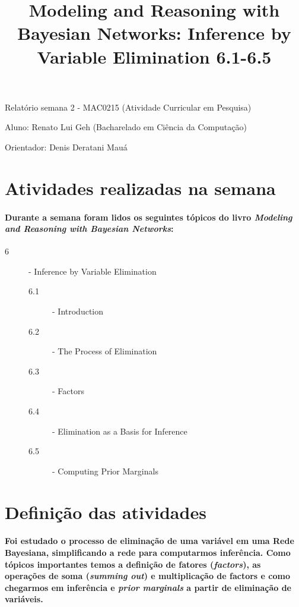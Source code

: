 \documentclass[a4paper,10pt]{article}
\title{\textbf{Modeling and Reasoning with Bayesian Networks: Inference by Variable Elimination 6.1-6.5}}
\theoremstyle{plain}
\begin{document}
\date{}
\author{}
\vspace*{-40pt}
{\let\newpage\relax\maketitle}

Relatório semana 2 - MAC0215 (Atividade Curricular em Pesquisa)

Aluno: Renato Lui Geh (Bacharelado em Ciência da Computação)

Orientador: Denis Deratani Mauá

\section{Atividades realizadas na semana}

\paragraph{
  Durante a semana foram lidos os seguintes tópicos do livro \textit{Modeling and Reasoning with
Bayesian Networks}\cite{bayes-net-darwiche}:
}

\begin{description}
  \item[6] - Inference by Variable Elimination
  \begin{description}
    \item[6.1] - Introduction
    \item[6.2] - The Process of Elimination
    \item[6.3] - Factors
    \item[6.4] - Elimination as a Basis for Inference
    \item[6.5] - Computing Prior Marginals
  \end{description}
\end{description}

\section{Definição das atividades}

\paragraph{
  Foi estudado o processo de eliminação de uma variável em uma Rede Bayesiana, simplificando a rede
para computarmos inferência. Como tópicos importantes temos a definição de fatores 
(\textit{factors}), as operações de soma (\textit{summing out}) e multiplicação de factors e como
chegarmos em inferência e \textit{prior marginals} a partir de eliminação de variáveis.
}
\end{document}
